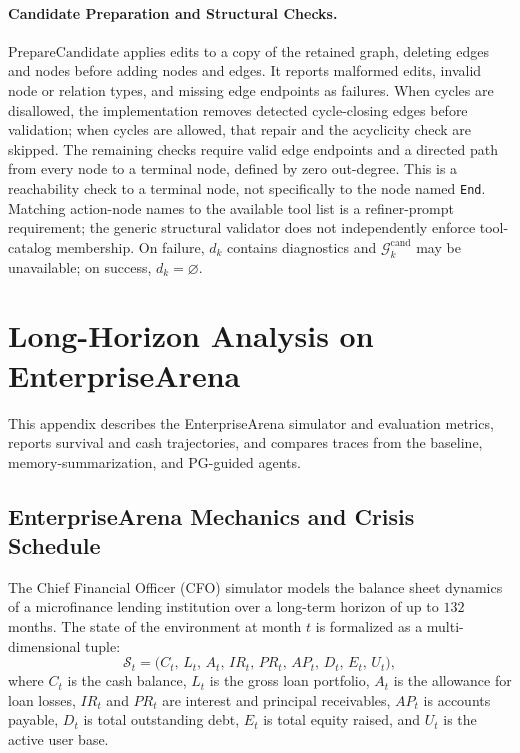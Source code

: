 \paragraph{Candidate Preparation and Structural Checks.}
$\mathrm{PrepareCandidate}$ applies edits to a copy of the retained graph, deleting edges and nodes before adding nodes and edges. It reports malformed edits, invalid node or relation types, and missing edge endpoints as failures. When cycles are disallowed, the implementation removes detected cycle-closing edges before validation; when cycles are allowed, that repair and the acyclicity check are skipped. The remaining checks require valid edge endpoints and a directed path from every node to a terminal node, defined by zero out-degree. This is a reachability check to a terminal node, not specifically to the node named \texttt{End}. Matching action-node names to the available tool list is a refiner-prompt requirement; the generic structural validator does not independently enforce tool-catalog membership. On failure, $d_k$ contains diagnostics and $\mathcal{G}_k^{\mathrm{cand}}$ may be unavailable; on success, $d_k=\varnothing$.

\section{Long-Horizon Analysis on EnterpriseArena}
\label{app:cfo_appendix}

This appendix describes the EnterpriseArena simulator and evaluation metrics, reports survival and cash trajectories, and compares traces from the baseline, memory-summarization, and PG-guided agents.

\subsection{EnterpriseArena Mechanics and Crisis Schedule}
\label{app:cfo_rules}

The Chief Financial Officer (CFO) simulator models the balance sheet dynamics of a microfinance lending institution over a long-term horizon of up to $132$ months. The state of the environment at month $t$ is formalized as a multi-dimensional tuple:
\begin{equation}
    \mathcal{S}_t = \big( C_t, \, L_t, \, A_t, \, IR_t, \, PR_t, \, AP_t, \, D_t, \, E_t, \, U_t \big),
\end{equation}
where $C_t$ is the cash balance, $L_t$ is the gross loan portfolio, $A_t$ is the allowance for loan losses, $IR_t$ and $PR_t$ are interest and principal receivables, $AP_t$ is accounts payable, $D_t$ is total outstanding debt, $E_t$ is total equity raised, and $U_t$ is the active user base.

